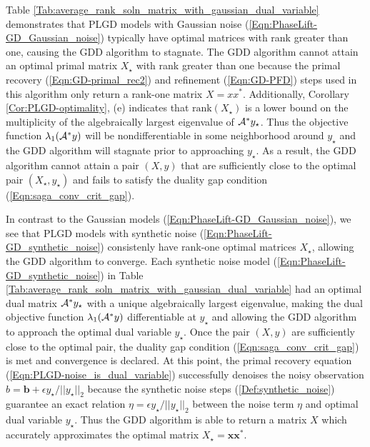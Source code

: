 Table \ref{Tab:average_rank_soln_matrix_with_gaussian_dual_variable} demonstrates that PLGD models with Gaussian noise (\ref{Eqn:PhaseLift-GD_Gaussian_noise}) typically have optimal matrices with rank greater than one, causing the GDD algorithm to stagnate.  
The GDD algorithm cannot attain an optimal primal matrix $X_\star$ with rank greater than one because the primal recovery (\ref{Eqn:GD-primal_rec2}) and refinement (\ref{Eqn:GD-PFD}) steps used in this algorithm only return a rank-one matrix $X = xx^*$.  
Additionally, Corollary \ref{Cor:PLGD-optimality}, (e) indicates that $\text{rank}(X_\star)$ is a lower bound on the multiplicity of the algebraically largest eigenvalue of ${\mathcal A}^*y_\star$.  
Thus the objective function $\lambda_1({\mathcal A}^*y)$ will be nondifferentiable in some neighborhood around $y_\star$ and the GDD algorithm will stagnate prior to approaching $y_\star$.  
As a result, the GDD algorithm cannot attain a pair $(X,y)$ that are sufficiently close to the optimal pair $(X_\star, y_\star)$ and fails to satisfy the duality gap condition (\ref{Eqn:saga_conv_crit_gap}).


In contrast to the Gaussian models (\ref{Eqn:PhaseLift-GD_Gaussian_noise}), we see that PLGD models with synthetic noise (\ref{Eqn:PhaseLift-GD_synthetic_noise}) consistenly have rank-one optimal matrices $X_\star$, allowing the GDD algorithm to converge.  
Each synthetic noise model (\ref{Eqn:PhaseLift-GD_synthetic_noise}) in Table \ref{Tab:average_rank_soln_matrix_with_gaussian_dual_variable} had an optimal dual matrix ${\mathcal A}^*y_\star$ with a unique algebraically largest eigenvalue, making the dual objective function $\lambda_1({\mathcal A}^*y)$ differentiable at $y_\star$ and allowing the GDD algorithm to approach the optimal dual variable $y_\star$.  
Once the pair $(X,y)$ are sufficiently close to the optimal pair, the duality gap condition (\ref{Eqn:saga_conv_crit_gap}) is met and convergence is declared.
At this point, the primal recovery equation (\ref{Eqn:PLGD-noise_is_dual_variable}) successfully denoises the noisy observation $b = \mathbf{b} + \epsilon y_\star / ||y_\star||_2$ because the synthetic noise steps (\ref{Def:synthetic_noise}) guarantee an exact relation $\eta = \epsilon y_\star / ||y_\star||_2$ between the noise term $\eta$ and optimal dual variable $y_\star$.
Thus the GDD algorithm is able to return a matrix $X$ which accurately approximates the optimal matrix $X_\star = \mathbf{x}\mathbf{x}^*$.  










